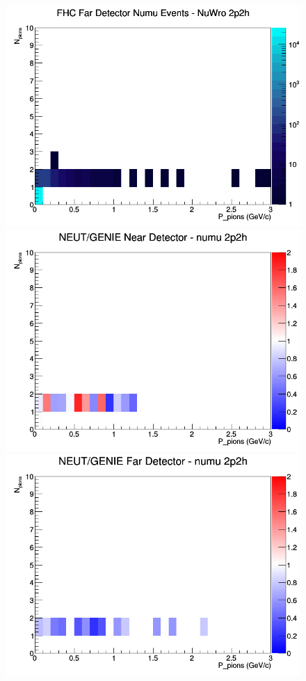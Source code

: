 \documentclass[12pt]{article}
\begin{document}
\begin{figure}[h]
\endminipage
{}
\includegraphics[width=\linewidth]{N_P/nominal/pions/2p2h_FHC_FD_numu_N_P_NuWro.png}
\endminipage
\newline
{}
\includegraphics[width=\linewidth]{N_P/nominal/pions/ratios/2p2h_NEUT_GENIE_numu_near_N_P.png}
\endminipage
{}
\includegraphics[width=\linewidth]{N_P/nominal/pions/ratios/2p2h_NEUT_GENIE_numu_far_N_P.png}

\end{figure}
\end{document}
